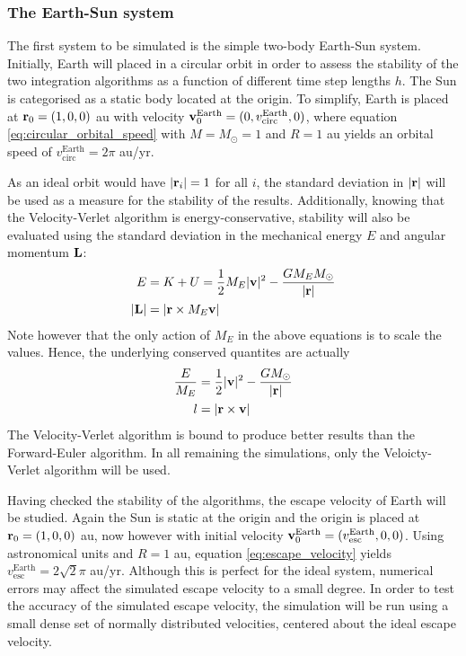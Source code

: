 \documentclass[reprint,english]{revtex4-1}
\begin{document}
\subsubsection{The Earth-Sun system}
The first system to be simulated is the simple two-body Earth-Sun system. Initially, Earth will placed in a circular orbit in order to assess the stability of the two integration algorithms as a function of different time step lengths \(h\). The Sun is categorised as a static body located at the origin. To simplify, Earth is placed at \(\vb{r}_0=(1,0,0)\) au with velocity \(\vb{v}_0^\text{Earth}=(0,v_\text{circ}^\text{Earth},0)\), where equation \eqref{eq:circular_orbital_speed} with \(M=M_\odot=1\) and \(R=1\) au yields an orbital speed of \(v_\text{circ}^\text{Earth}=2\pi\) au/yr.

As an ideal orbit would have \(|\vb{r}_i|=1\) for all \(i\), the standard deviation in \(|\vb{r}|\) will be used as a measure for the stability of the results. Additionally, knowing that the Velocity-Verlet algorithm is energy-conservative, stability will also be evaluated using the standard deviation in the mechanical energy \(E\) and angular momentum \(\vb{L}\):
\begin{subequations}
\begin{align}
E&=K+U=\frac{1}{2}M_E|\vb{v}|^2-\frac{GM_EM_\odot}{|\vb{r}|}\label{eq:mechanical_energy}\\
|\vb{L}|&=|\vb{r}\times M_E\vb{v}|\label{eq:angular_momentum}
\end{align}
\end{subequations}
Note however that the only action of \(M_E\) in the above equations is to scale the values. Hence, the underlying conserved quantites are actually
\begin{subequations}
\begin{align}
\frac{E}{M_E}&=\frac{1}{2}|\vb{v}|^2-\frac{GM_\odot}{|\vb{r}|}\\
l&=|\vb{r}\times\vb{v}|
\end{align}
\end{subequations}
The Velocity-Verlet algorithm is bound to produce better results than the Forward-Euler algorithm. In all remaining the simulations, only the Veloicty-Verlet algorithm will be used.

Having checked the stability of the algorithms, the escape velocity of Earth will be studied. Again the Sun is static at the origin and the origin is placed at \(\vb{r}_0=(1,0,0)\) au, now however with initial velocity \(\vb{v}_0^\text{Earth}=(v_\text{esc}^\text{Earth},0,0)\). Using astronomical units and \(R=1\) au, equation \eqref{eq:escape_velocity} yields \(v_\text{esc}^\text{Earth}=2\sqrt{2}\pi\) au/yr. Although this is perfect for the ideal system, numerical errors may affect the simulated escape velocity to a small degree. In order to test the accuracy of the simulated escape velocity, the simulation will be run using a small dense set of normally distributed velocities, centered about the ideal escape velocity.
\end{document}
